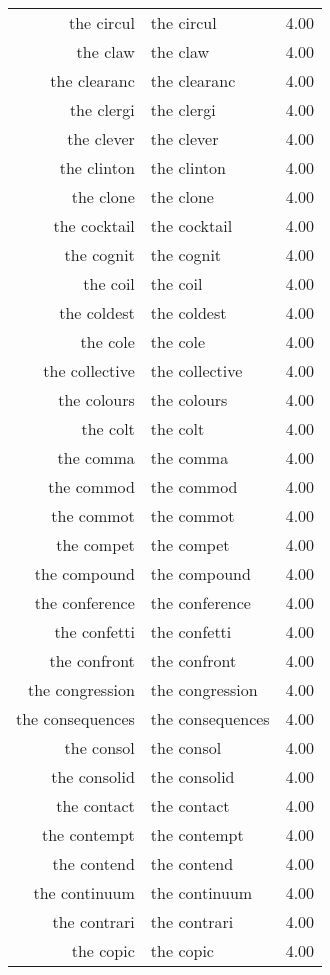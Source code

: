 \begin{table}[ht]
\begin{tabular}{rlr}
  the circul & the circul & 4.00 \\ 
  the claw & the claw & 4.00 \\ 
  the clearanc & the clearanc & 4.00 \\ 
  the clergi & the clergi & 4.00 \\ 
  the clever & the clever & 4.00 \\ 
  the clinton & the clinton & 4.00 \\ 
  the clone & the clone & 4.00 \\ 
  the cocktail & the cocktail & 4.00 \\ 
  the cognit & the cognit & 4.00 \\ 
  the coil & the coil & 4.00 \\ 
  the coldest & the coldest & 4.00 \\ 
  the cole & the cole & 4.00 \\ 
  the collective & the collective & 4.00 \\ 
  the colours & the colours & 4.00 \\ 
  the colt & the colt & 4.00 \\ 
  the comma & the comma & 4.00 \\ 
  the commod & the commod & 4.00 \\ 
  the commot & the commot & 4.00 \\ 
  the compet & the compet & 4.00 \\ 
  the compound & the compound & 4.00 \\ 
  the conference & the conference & 4.00 \\ 
  the confetti & the confetti & 4.00 \\ 
  the confront & the confront & 4.00 \\ 
  the congression & the congression & 4.00 \\ 
  the consequences & the consequences & 4.00 \\ 
  the consol & the consol & 4.00 \\ 
  the consolid & the consolid & 4.00 \\ 
  the contact & the contact & 4.00 \\ 
  the contempt & the contempt & 4.00 \\ 
  the contend & the contend & 4.00 \\ 
  the continuum & the continuum & 4.00 \\ 
  the contrari & the contrari & 4.00 \\ 
  the copic & the copic & 4.00 \\ 

\end{tabular}
\end{table}
